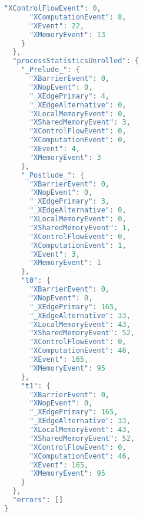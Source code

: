 \begin{multicols*}{2}
\begin{lstlisting}[basicstyle=\footnotesize\ttfamily,language=Java]
      "XControlFlowEvent": 0,
      "XComputationEvent": 8,
      "XEvent": 22,
      "XMemoryEvent": 13
    }
  },
  "processStatisticsUnrolled": {
    "_Prelude_": {
      "XBarrierEvent": 0,
      "XNopEvent": 0,
      "_XEdgePrimary": 4,
      "_XEdgeAlternative": 0,
      "XLocalMemoryEvent": 0,
      "XSharedMemoryEvent": 3,
      "XControlFlowEvent": 0,
      "XComputationEvent": 0,
      "XEvent": 4,
      "XMemoryEvent": 3
    },
    "_Postlude_": {
      "XBarrierEvent": 0,
      "XNopEvent": 0,
      "_XEdgePrimary": 3,
      "_XEdgeAlternative": 0,
      "XLocalMemoryEvent": 0,
      "XSharedMemoryEvent": 1,
      "XControlFlowEvent": 0,
      "XComputationEvent": 1,
      "XEvent": 3,
      "XMemoryEvent": 1
    },
    "t0": {
      "XBarrierEvent": 0,
      "XNopEvent": 0,
      "_XEdgePrimary": 165,
      "_XEdgeAlternative": 33,
      "XLocalMemoryEvent": 43,
      "XSharedMemoryEvent": 52,
      "XControlFlowEvent": 0,
      "XComputationEvent": 46,
      "XEvent": 165,
      "XMemoryEvent": 95
    },
    "t1": {
      "XBarrierEvent": 0,
      "XNopEvent": 0,
      "_XEdgePrimary": 165,
      "_XEdgeAlternative": 33,
      "XLocalMemoryEvent": 43,
      "XSharedMemoryEvent": 52,
      "XControlFlowEvent": 0,
      "XComputationEvent": 46,
      "XEvent": 165,
      "XMemoryEvent": 95
    }
  },
  "errors": []
}
\end{lstlisting}
\end{multicols*}
